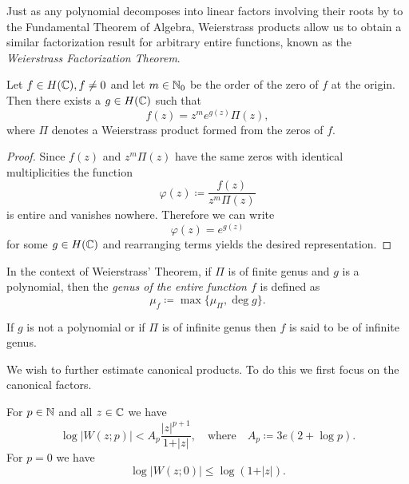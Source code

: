 Just as any polynomial decomposes into linear factors involving their roots by to the Fundamental Theorem of Algebra, Weierstrass products allow us to obtain a similar factorization result for arbitrary entire functions, known as the \emph{Weierstrass Factorization Theorem}.

\begin{theorem}[Weierstrass] \label{thm:weierstrass}
    Let $f \in H(\mathbb{C}), f \neq 0$ and let $m \in \mathbb{N}_0$ be the order of the zero of $f$ at the origin. Then there exists a $g \in H(\mathbb{C})$ such that
    \begin{equation}
        f(z) = z^m e^{g(z)} \Pi(z),
    \end{equation}
    where $\Pi$ denotes a Weierstrass product formed from the zeros of $f$.
\end{theorem}

\begin{proof}
    Since $f(z)$ and $z^m \Pi(z)$ have the same zeros with identical multiplicities the function
    $$ \varphi(z) \coloneqq \frac{f(z)}{z^m \Pi(z)} $$
    is entire and vanishes nowhere. Therefore we can write
    $$ \varphi(z) = e^{g(z)} $$
    for some $g \in H(\mathbb{C})$ and rearranging terms yields the desired representation.
\end{proof}

\begin{definition} \label{def:genus}
    In the context of Weierstrass' Theorem, if $\Pi$ is of finite genus and $g$ is a polynomial, then the \emph{genus of the entire function $f$} is defined as
    \begin{equation}
        \mu_f \coloneqq \max \{ \mu_\Pi, \deg g \}.
    \end{equation}

    If $g$ is not a polynomial or if $\Pi$ is of infinite genus then $f$ is said to be of infinite genus.
\end{definition}

We wish to further estimate canonical products. To do this we first focus on the canonical factors.

\begin{lemma} \label{lem:elementary-factor-estimate}
    For $p \in \mathbb{N}$ and all $z \in \mathbb{C}$ we have
    \begin{equation}
        \log \vert W(z; p) \vert < A_p \frac{\vert z \vert^{p+1}}{1 + \vert z \vert}, \quad \textrm{where} \quad A_p \coloneqq 3e (2 + \log p).
    \end{equation}
    For $p = 0$ we have
    \begin{equation}
        \log \vert W(z; 0) \vert \leq \log (1 + \vert z \vert).
    \end{equation}
\end{lemma}

